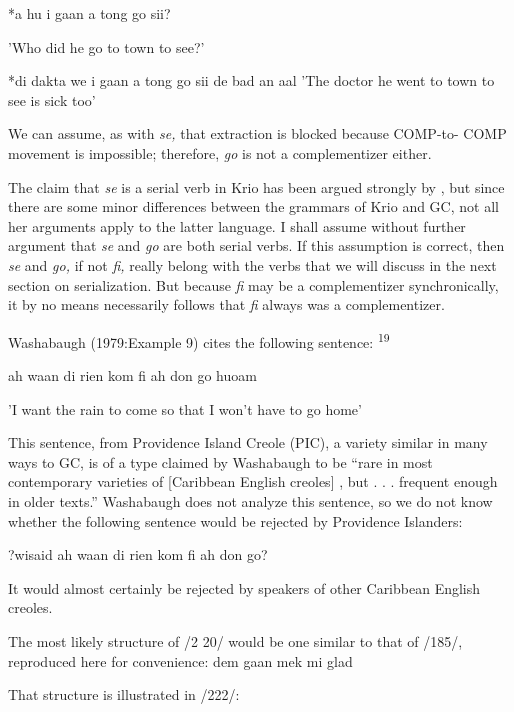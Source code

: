 \ea\label{ex:218}
 *a hu i gaan a tong go sii?
\glt
\z

'Who did he go to town to see?'

\ea\label{ex:219}
 *di dakta we i gaan a tong go sii de bad an aal 'The doctor he went to town to see is sick too'
\glt
\z

We can assume, as with \textit{se,} that extraction is blocked because COMP-to- 
COMP movement is impossible; therefore, \textit{go} is not a complementizer either.

The claim that \textit{se }is a serial verb in Krio has been argued strongly
by \citet{Larimore1976}, but since there are some minor differences be\-tween the grammars of Krio and GC, not all her arguments apply to the latter language. I shall assume without further argument that \textit{se} and \textit{go} are both serial verbs. If this assumption is correct, then \textit{se} and \textit{go,} if not \textit{fi,} really belong with the verbs that we will discuss in the next section on serialization. But because \textit{fi} may be a comple\-mentizer synchronically, it by no means necessarily follows that \textit{fi} always was a complementizer.

Washabaugh (1979:Example 9) cites the following sentence: \textsuperscript{19}

\ea\label{ex:220}
 ah waan di rien kom fi ah don go huoam
\glt
\z

'I want the rain to come so that I won't have to go home'

This sentence, from Providence Island Creole (PIC), a variety similar in many ways to GC, is of a type claimed by Washabaugh to be ``rare in most contemporary varieties of [Caribbean English creoles] , but . . . frequent enough in older texts.'' Washabaugh does not analyze this sentence, so we do not know whether the following sentence would be rejected by Providence Islanders:

\ea\label{ex:221}
 ?wisaid ah waan di rien kom fi ah don go?
\glt
\z

It would almost certainly be rejected by speakers of other Caribbean English creoles.

The most likely structure of /2 20/ would be one similar to that
of /185/, reproduced here for convenience: dem gaan mek mi glad

That structure is illustrated in /222/:



